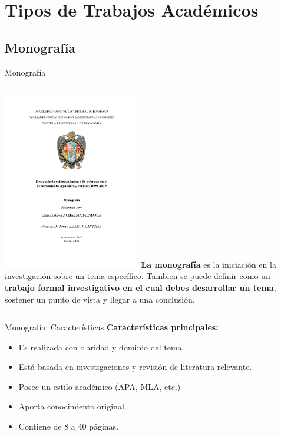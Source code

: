 \documentclass[
11pt, %
]{beamer}
\begin{document}
\section{Tipos de Trabajos Académicos}

\subsection{Monografía}

\begin{frame}{Monografía}
	\begin{columns}[T]
		\centering
		\includegraphics[width=6cm]{caratula monografia.jpg} %
		\vspace{0.5cm}
		\textbf{La monografía} es la iniciación en la investigación sobre un tema específico. Tambien se puede definir como un \textbf{trabajo formal investigativo en el cual debes
			desarrollar un tema}, sostener un punto de vista y llegar a una conclusión.
	\end{columns}
\end{frame}

\begin{frame}{Monografía: Características}
	\textbf{Características principales:}
	\begin{itemize}
		\item Es realizada con claridad y dominio del tema.
		\item Está basada en investigaciones y revisión de literatura relevante.
		\item Posee un estilo académico (APA, MLA, etc.)
		\item Aporta conocimiento original.
		\item Contiene de 8 a 40 páginas.
	\end{itemize}
\end{frame}
\end{document}

